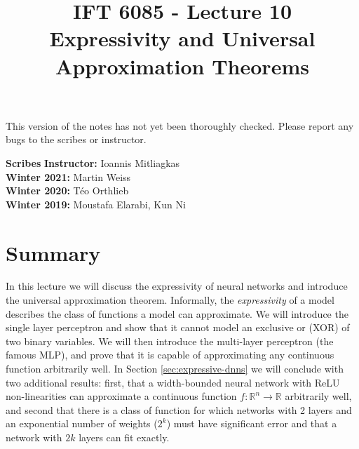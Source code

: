 \documentclass{article}
\title{IFT 6085 - Lecture 10 \\ 
Expressivity and Universal Approximation Theorems}
\date{}
\begin{document}
 

\maketitle

\vspace{-0.5in}
\begin{center}
This version of the notes has not yet been thoroughly checked.
Please report any bugs to the scribes or instructor.
\end{center}
\vspace{0.2in}

\textbf{Scribes}\hfill
\textbf{Instructor:}  Ioannis Mitliagkas \\
\textbf{Winter 2021:} Martin Weiss \\
\textbf{Winter 2020:} Téo Orthlieb \\
\textbf{Winter 2019:} Moustafa Elarabi, Kun Ni \\

\newcommand{\infgc}{\inf_{g \in \mathcal{C}}}
\newcommand{\supgc}{\sup_{g \in \mathcal{C}}}
\newcommand{\Prob}{\mathbb{P}}
\newcommand{\E}{\mathbb{E}}
\newcommand{\reals}{\mathbb{R}}


\section{Summary}

In this lecture we will discuss the expressivity of neural networks and introduce the universal approximation theorem. Informally, the \textit{expressivity} of a model describes the class of functions a model can approximate. We will introduce the single layer perceptron and show that it cannot model an exclusive or (XOR) of two binary variables. We will then introduce the multi-layer perceptron (the famous MLP), and prove that it is capable of approximating any continuous function arbitrarily well. In Section \ref{sec:expressive-dnns} we will conclude with two additional results: first, that a width-bounded neural network with ReLU non-linearities can approximate a continuous function $f: \mathbb{R}^n \to \mathbb{R}$ arbitrarily well, and second that there is a class of function for which networks with 2 layers and an exponential number of weights ($2^k$) must have significant error and that a network with $2k$ layers can fit exactly.
\end{document}
